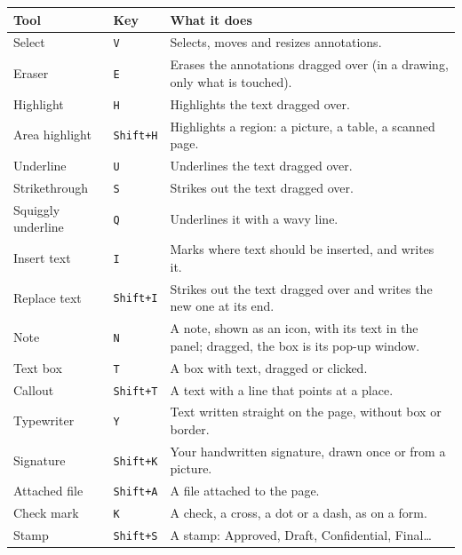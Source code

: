 \documentclass[12pt,
              article,
              oneside
              ]{memoir}
\newcommand*{\key}[1]{\texttt{#1}}
\begin{document}
%
\begin{longtable}{@{}p{}lp{}@{}}
\toprule
Tool & Key & What it does\\
\midrule
\endhead
Select & \key{V} & Selects, moves and resizes annotations.\\
Eraser & \key{E} & Erases the annotations dragged over (in a drawing, only what is touched).\\
Highlight & \key{H} & Highlights the text dragged over.\\
Area highlight & \key{Shift+H} & Highlights a region: a picture, a table, a scanned page.\\
Underline & \key{U} & Underlines the text dragged over.\\
Strikethrough & \key{S} & Strikes out the text dragged over.\\
Squiggly underline & \key{Q} & Underlines it with a wavy line.\\
Insert text & \key{I} & Marks where text should be inserted, and writes it.\\
Replace text & \key{Shift+I} & Strikes out the text dragged over and writes the new one at its end.\\
Note & \key{N} & A note, shown as an icon, with its text in the panel; dragged, the box is its pop-up window.\\
Text box & \key{T} & A box with text, dragged or clicked.\\
Callout & \key{Shift+T} & A text with a line that points at a place.\\
Typewriter & \key{Y} & Text written straight on the page, without box or border.\\
Signature & \key{Shift+K} & Your handwritten signature, drawn once or from a picture.\\
Attached file & \key{Shift+A} & A file attached to the page.\\
Check mark & \key{K} & A check, a cross, a dot or a dash, as on a form.\\
Stamp & \key{Shift+S} & A stamp: Approved, Draft, Confidential, Final\ldots\\

\end{longtable}
\end{document}
